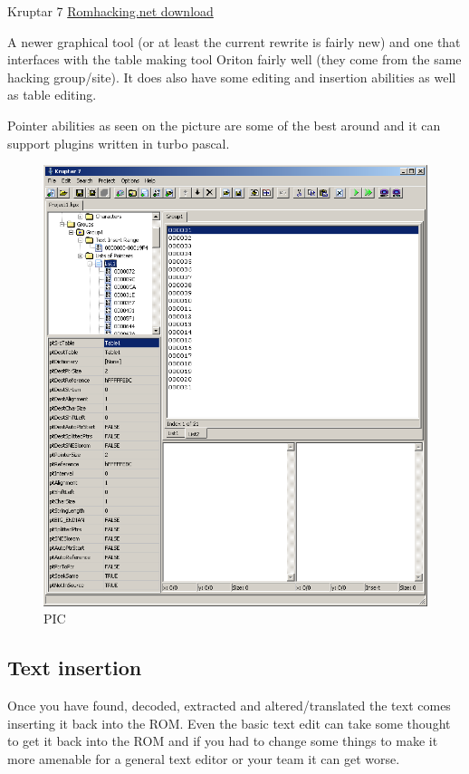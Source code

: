 \documentclass[
]{book}
\begin{document}
Kruptar 7 \href{http://www.romhacking.net/utilities/612/}{Romhacking.net download}

A newer graphical tool (or at least the current rewrite is fairly new) and one that interfaces with the table making tool Oriton fairly well (they come from the same hacking group/site). It does also have some editing and insertion abilities as well as table editing.

Pointer abilities as seen on the picture are some of the best around and it can support plugins written in turbo pascal.

\begin{figure}
\centering
\includegraphics{images/133_home_fast6191_romhackingguide_unrenamed_fil___mhackguidetextextractionkruptar7_1_tofinish.png}
\caption{PIC}
\end{figure}

\hypertarget{text-insertion}{%
\subsection{Text insertion}\label{text-insertion}}

Once you have found, decoded, extracted and altered/translated the text comes inserting it back into the ROM. Even the basic text edit can take some thought to get it back into the ROM and if you had to change some things to make it more amenable for a general text editor or your team it can get worse.
\end{document}
